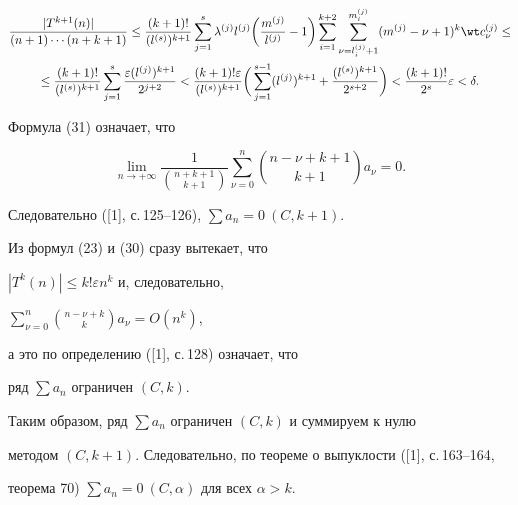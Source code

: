 \begin{multline}


\frac{| T^{k+1} (n) |}{(n+1) \dotsb (n+k+1)} \le 


\frac{(k+1)!}{(l^{(s)})^{k+1}} \sum_{j=1}^{s} 


\lambda^{(j)} l^{(j)} \bigg(\frac{m^{(j)}}{l^{(j)}}-1\bigg)\sum_{i=1}^{k+2} 


\sum_{\nu=l_i^{(j)}+1}^{m_i^{(j)}} (m^{(j)}-\nu+1)^{k}\wt c{}_{\nu}^{(j)} \le \\


%


\le \frac{(k+1)!}{(l^{(s)})^{k+1}}\sum_{j=1}^{s} \frac{\varepsilon 


(l^{(j)})^{k+1}} {2^{j+2}}<\frac{(k+1)! \varepsilon}{(l^{(s)})^{k+1}}


\bigg(\sum_{j=1}^{s-1}(l^{(j)})^{k+1}+


\frac{(l^{(s)})^{k+1}}{2^{s+2}} \bigg)< 


%


\frac{(k+1)!}{2^s} \varepsilon<\delta.


\end{multline}


Формула (31) означает, что 


$$


\lim_{n\to+\infty}\frac{1}{{n+k+1 \choose k+1}}\sum_{\nu=0}^n


{n-\nu+k+1 \choose k+1} a_{\nu}=0.


$$


Следовательно ([1], с.\,125--126), $\sum a_n=0 \ (C, k+1)$.





Из формул (23) и (30) сразу вытекает, что


$|T^{k} (n)|\le k! \varepsilon n^k$ и, следовательно, 


$\sum\limits_{\nu=0}^n {n-\nu+k \choose k} a_{\nu}=O(n^k)$, 


а это по определению ([1], с.\,128) означает, что 


ряд $\sum a_n$ ограничен $(C, k)$.





Таким образом, ряд $\sum a_n$ ограничен $(C, k)$ и суммируем к нулю 


методом $(C, k+1)$. Следовательно, по теореме о выпуклости ([1], с.\,163--164,


теорема 70) $\sum a_n=0 \ (C, \alpha)$ для всех $\alpha>k$.





